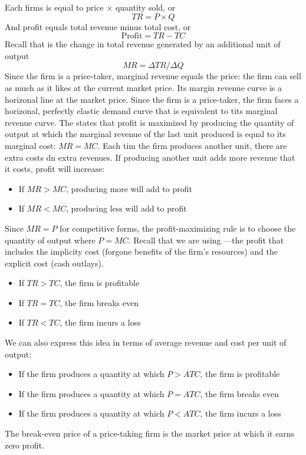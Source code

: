 \documentclass{article}
\begin{document}
Each firms  is equal to price $\times$ quantity sold, or $$TR = P \times Q$$ And profit equals total revenue minus total cost, or $$\textrm{Profit} = TR - TC$$ Recall that  is the change in total revenue generated by an additional unit of output $$MR = \Delta TR / \Delta Q$$ Since the firm is a price-taker, marginal revenue equals the price: the firm can sell as much as it likes at the current market price. Its margin revenue curve is a horizonal line at the market price. Since the firm is a price-taker, the firm faces a horizonal, perfectly elastic demand curve that is equivalent to tits marginal revenue curve. The  states that profit is maximized by producing the quantity of output at which the marginal revenue of the last unit produced is equal to its marginal cost: $MR = MC$. Each tim the firm produces another unit, there are extra costs dn extra revenues. If producing another unit adds more revenue that it costs, profit will increase: 
\begin{itemize}
  \item If $MR > MC$, producing more will add to profit 
  \item If $MR < MC$, producing less will add to profit
\end{itemize}
Since $MR=P$ for competitive forms, the profit-maximizing rule is to choose the quantity of output where $P=MC$. Recall that we are using ---the profit that includes the implicity cost (forgone benefits of the firm's resources) and the explicit cost (cash outlays). 
\begin{itemize}
  \item If $TR > TC$, the firm is profitable 
  \item If $TR = TC$, the firm breaks even 
  \item If $TR < TC$, the firm incurs a loss 
\end{itemize}
We can also express this idea in terms of average revenue and cost per unit of output: 
\begin{itemize}
  \item If the firm produces a quantity at which $P > ATC$, the firm is profitable 
  \item If the firm produces a quantity at which $P=ATC$, the firm breaks even 
  \item If the firm produces a quantity at which $P < ATC$, the firm incurs a loss
\end{itemize}

The break-even price of a price-taking firm is the market price at which it earns zero profit. \\ 
\end{document}
